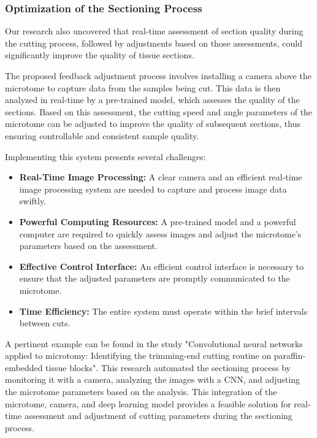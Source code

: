 \subsubsection{Optimization of the Sectioning Process}

Our research also uncovered that real-time assessment of section quality during the cutting process, followed by adjustments based on those assessments, could significantly improve the quality of tissue sections.

The proposed feedback adjustment process involves installing a camera above the microtome to capture data from the samples being cut. This data is then analyzed in real-time by a pre-trained model, which assesses the quality of the sections. Based on this assessment, the cutting speed and angle parameters of the microtome can be adjusted to improve the quality of subsequent sections, thus ensuring controllable and consistent sample quality.

Implementing this system presents several challenges:

\begin{itemize}
    \item \textbf{Real-Time Image Processing:} A clear camera and an efficient real-time image processing system are needed to capture and process image data swiftly.
    \item \textbf{Powerful Computing Resources:} A pre-trained model and a powerful computer are required to quickly assess images and adjust the microtome's parameters based on the assessment.
    \item \textbf{Effective Control Interface:} An efficient control interface is necessary to ensure that the adjusted parameters are promptly communicated to the microtome.
    \item \textbf{Time Efficiency:} The entire system must operate within the brief intervals between cuts.
\end{itemize}

A pertinent example can be found in the study "Convolutional neural networks applied to microtomy: Identifying the trimming-end cutting routine on paraffin-embedded tissue blocks"\cite{6.4}. This research automated the sectioning process by monitoring it with a camera, analyzing the images with a CNN, and adjusting the microtome parameters based on the analysis. This integration of the microtome, camera, and deep learning model provides a feasible solution for real-time assessment and adjustment of cutting parameters during the sectioning process.

